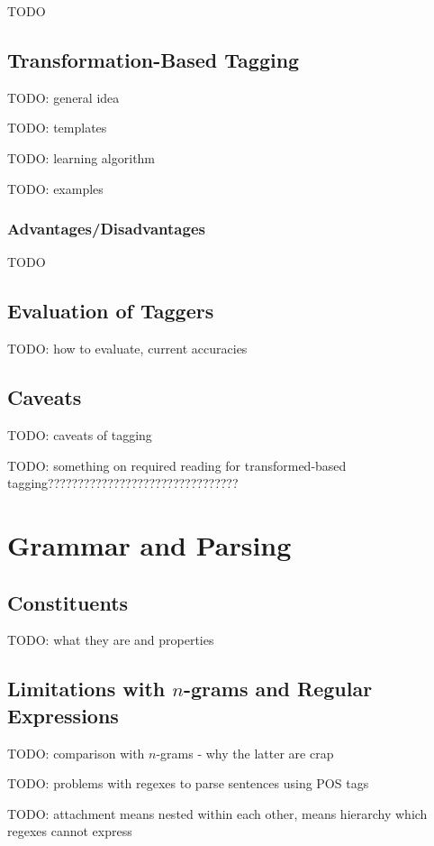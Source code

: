 \documentclass{article}
\begin{document}
TODO

\subsection{Transformation-Based Tagging}

TODO: general idea

TODO: templates

TODO: learning algorithm

TODO: examples

\subsubsection{Advantages/Disadvantages}

TODO

\subsection{Evaluation of Taggers}

TODO: how to evaluate, current accuracies

\subsection{Caveats}

TODO: caveats of tagging


TODO: something on required reading for transformed-based tagging????????????????????????????????

\section{Grammar and Parsing}

\subsection{Constituents}

TODO: what they are and properties

\subsection{Limitations with $n$-grams and Regular Expressions}

TODO: comparison with $n$-grams - why the latter are crap

TODO: problems with regexes to parse sentences using POS tags

TODO: attachment means nested within each other, means hierarchy which regexes cannot express
\end{document}
